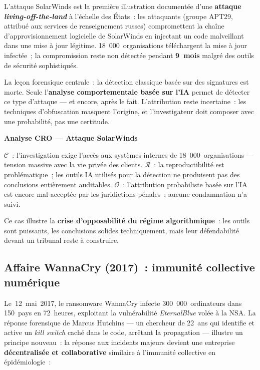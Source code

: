 L'attaque SolarWinds est la première illustration documentée d'une
\textbf{attaque \textit{living-off-the-land}} à l'échelle des États~:
les attaquants (groupe APT29, attribué aux services de renseignement russes)
compromettent la chaîne d'approvisionnement logicielle de SolarWinds en
injectant un code malveillant dans une mise à jour légitime. 18~000~organisations
téléchargent la mise à jour infectée~; la compromission reste non détectée
pendant \textbf{9~mois} malgré des outils de sécurité sophistiqués.

\medskip

La leçon forensique centrale~: la détection classique basée sur des signatures
est morte. Seule l'\textbf{analyse comportementale basée sur l'IA} permet
de détecter ce type d'attaque --- et encore, après le fait. L'attribution
reste incertaine~: les techniques d'obfuscation masquent l'origine, et
l'investigateur doit composer avec une probabilité, pas une certitude.

\begin{boxCRO}
\textbf{Analyse CRO --- Attaque SolarWinds}

$\mathcal{C}$~: l'investigation exige l'accès aux systèmes internes de
18~000~organisations --- tension massive avec la vie privée des clients.
$\mathcal{R}$~: la reproductibilité est problématique~; les outils IA
utilisés pour la détection ne produisent pas des conclusions entièrement
auditables. $\mathcal{O}$~: l'attribution probabiliste basée sur l'IA
est encore mal acceptée par les juridictions pénales~; aucune condamnation
n'a suivi. 

Ce cas illustre la \textbf{crise d'opposabilité du régime algorithmique}~:
les outils sont puissants, les conclusions solides techniquement, mais leur
défendabilité devant un tribunal reste à construire.
\end{boxCRO}

\subsection{Affaire WannaCry (2017)~: immunité collective numérique}

Le~12~mai~2017, le ransomware WannaCry infecte 300~000~ordinateurs dans
150~pays en 72~heures, exploitant la vulnérabilité \textit{EternalBlue}
volée à la NSA. La réponse forensique de Marcus Hutchins --- un chercheur
de 22~ans qui identifie et active un \textit{kill switch} caché dans le code,
arrêtant la propagation --- illustre un principe nouveau~: la réponse aux
incidents majeurs devient une entreprise \textbf{décentralisée et collaborative}
similaire à l'immunité collective en épidémiologie~:

